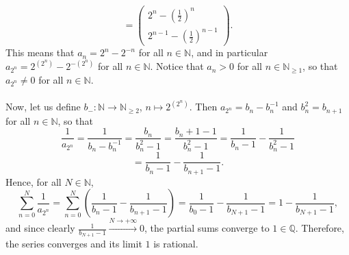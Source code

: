 \begin{solution}
\[    \]
    \[
        = \begin{pmatrix} 2^n - \left(\frac{1}{2}\right)^n \\ 2^{n-1} - \left(\frac{1}{2}\right)^{n-1} \end{pmatrix}.
    \]
    This means that \( a_n = 2^n - 2^{-n} \) for all \( n \in \mathbb{N} \), and in particular \( a_{2^n} = 2^{\left(2^n\right)} - 2^{-\left(2^n\right)} \) for all \( n \in \mathbb{N} \). Notice that \( a_n>0 \) for all \( n \in \mathbb{N}_{\geq 1} \), so that \( a_{2^n} \neq 0 \) for all \( n \in \mathbb{N} \).
    \\\\
    Now, let us define \( b_{-} \colon \mathbb{N} \to \mathbb{N}_{\geq 2} \), \( n \mapsto 2^{\left(2^n\right)} \). Then \( a_{2^n} = b_n - b_n^{-1} \) and \( b_n^2=b_{n+1} \) for all \( n \in \mathbb{N} \), so that
    \[
        \frac{1}{a_{2^n}} = \frac{1}{b_n - b_n^{-1}} = \frac{b_n}{b_n^2 - 1} = \frac{b_n + 1 - 1}{b_n^2 - 1} = \frac{1}{b_n - 1} - \frac{1}{b_n^2 - 1}
    \]
    \[
        = \frac{1}{b_n - 1} - \frac{1}{b_{n+1} - 1}.
    \]
    Hence, for all \( N \in \mathbb{N} \),
    \[
        \sum_{n=0}^{N} \frac{1}{a_{2^n}} = \sum_{n=0}^{N} \left(\frac{1}{b_n - 1} - \frac{1}{b_{n+1} - 1}\right) = \frac{1}{b_0 - 1} - \frac{1}{b_{N+1} - 1}= 1 - \frac{1}{b_{N+1} - 1},
    \]
    and since clearly \( \frac{1}{b_{N+1} - 1} \overset{N \to +\infty}{\longrightarrow} 0 \), the partial sums converge to \( 1 \in \mathbb{Q} \). Therefore, the series converges and its limit \( 1 \) is rational.
\end{solution}
